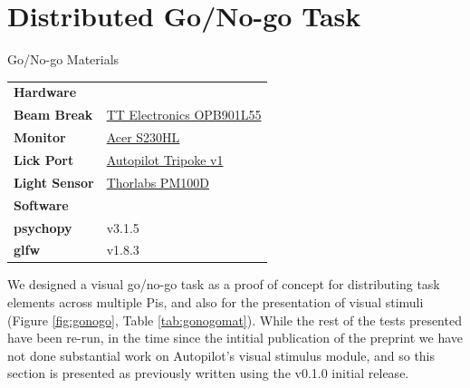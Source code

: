 \section{Distributed Go/No-go Task}
\label{sec:gonogo}

\begin{margintable}[0.4cm]
\caption{Go/No-go Materials}
\label{tab:gonogomat}
\noindent\begin{tabularx}{\linewidth}{lX}%
\toprule
\textbf{Hardware} & \\
\textbf{Beam Break} & \href{https://wiki.auto-pi-lot.com/index.php/TT_Electronics_OPB901L55}{TT Electronics OPB901L55} \\
\textbf{Monitor} & \href{https://www.productchart.com/monitors/16901}{Acer S230HL} \\
\textbf{Lick Port} & \href{https://wiki.auto-pi-lot.com/index.php/Autopilot_Tripoke}{Autopilot Tripoke v1} \\
\textbf{Light Sensor} & \href{https://www.thorlabs.com/newgrouppage9.cfm?objectgroup_id=3341}{Thorlabs PM100D} \\
\midrule
\textbf{Software} & \\
\textbf{psychopy} & v3.1.5 \\
\textbf{glfw} & v1.8.3 \\
\bottomrule
\end{tabularx}
\end{margintable}{}

We designed a visual go/no-go task as a proof of concept for distributing task elements across multiple Pis, and also for the presentation of visual stimuli (Figure \ref{fig:gonogo}, Table \ref{tab:gonogomat}). While the rest of the tests presented have been re-run, in the time since the intitial publication of the preprint we have not done substantial work on Autopilot's visual stimulus module, and so this section is presented as previously written using the v0.1.0 initial release.

